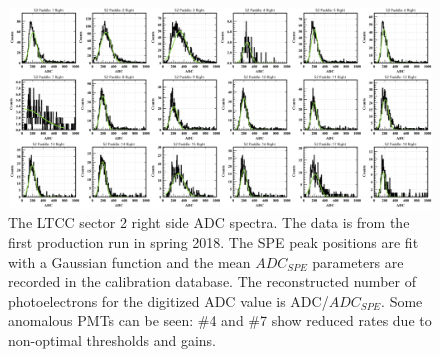 \begin{figure}
	\centering
	\includegraphics[width=2.1\columnwidth,keepaspectratio]{img/spe.png}
	\caption{The LTCC sector 2 right side ADC spectra. The data is from the first production run in spring 2018.
          The SPE peak positions are fit with a Gaussian function and the mean $ADC_{SPE}$ parameters are recorded
          in the calibration database. The reconstructed number of photoelectrons for the digitized ADC value is
          ADC/$ADC_{SPE}$. Some anomalous PMTs can be seen: \#4 and \#7 show reduced rates due to non-optimal
          thresholds and gains.}
	\label{fig:speCalibration}
\end{figure}

